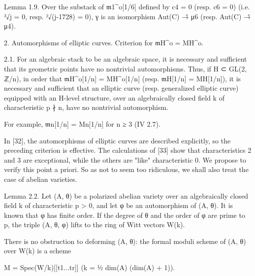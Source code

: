 \documentclass[11pt,a4paper]{article}
\begin{document}
Lemma 1.9. Over the substack of \ensuremath{\mathfrak{m}}\textunderscore{}1\textasciicircum{}o[1/6] defined by c\textunderscore{}4 = 0 (resp. c\textunderscore{}6 = 0) (i.e. ³√j = 0, resp. ²√(j-1728) = 0), γ is an isomorphism Aut(C) →̃ μ\textunderscore{}6 (resp. Aut(C) →̃ μ\textunderscore{}4).

2. Automorphisms of elliptic curves. Criterion for \ensuremath{\mathfrak{m}}\textunderscore{}H\textasciicircum{}o = M\textunderscore{}H\textasciicircum{}o.

2.1. For an algebraic stack to be an algebraic space, it is necessary and sufficient that its geometric points have no nontrivial automorphisms. Thus, if H ⊂ GL(2, ℤ/n), in order that \ensuremath{\mathfrak{m}}\textunderscore{}H\textasciicircum{}o[1/n] = M\textunderscore{}H\textasciicircum{}o[1/n] (resp. \ensuremath{\mathfrak{m}}\textunderscore{}H[1/n] = M\textunderscore{}H[1/n]), it is necessary and sufficient that an elliptic curve (resp. generalized elliptic curve) equipped with an H-level structure, over an algebraically closed field k of characteristic p ∤ n, have no nontrivial automorphism.

For example, \ensuremath{\mathfrak{m}}\textunderscore{}n[1/n] = M\textunderscore{}n[1/n] for n ≥ 3 (IV 2.7).

In [32], the automorphisms of elliptic curves are described explicitly, so the preceding criterion is effective. The calculations of [33] show that characteristics 2 and 3 are exceptional, while the others are "like" characteristic 0. We propose to verify this point a priori. So as not to seem too ridiculous, we shall also treat the case of abelian varieties.

Lemma 2.2. Let (A, θ) be a polarized abelian variety over an algebraically closed field k of characteristic p > 0, and let φ be an automorphism of (A, θ). It is known that φ has finite order. If the degree of θ and the order of φ are prime to p, the triple (A, θ, φ) lifts to the ring of Witt vectors W(k).

There is no obstruction to deforming (A, θ): the formal moduli scheme of (A, θ) over W(k) is a scheme

M = Spec(W/k)[[t\textunderscore{}1...t\textunderscore{}r]]        (k = ½ dim(A) (dim(A) + 1)).
\end{document}
